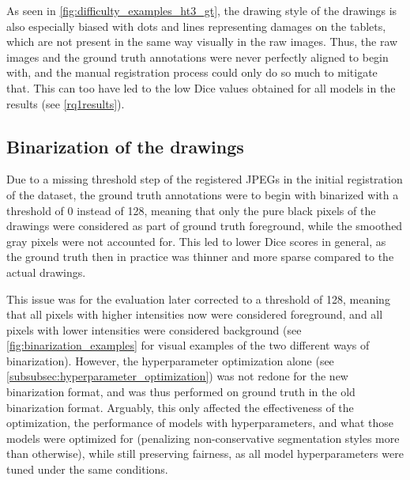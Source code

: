As seen in \cref{fig:difficulty_examples_ht3_gt}, the drawing style of the drawings is also especially biased with dots and lines representing damages on the tablets, which are not present in the same way visually in the raw images.
Thus, the raw images and the ground truth annotations were never perfectly aligned to begin with, and the manual registration process could only do so much to mitigate that.
This can too have led to the low \acs{Dice} values obtained for all models in the results (see \cref{rq1results}).

\subsection{Binarization of the drawings}
\label{subsec:binarization}
Due to a missing threshold step of the registered JPEGs in the initial registration of the dataset, the ground truth annotations were to begin with binarized with a threshold of 0 instead of 128, meaning that only the pure black pixels of the drawings were considered as part of ground truth foreground, while the smoothed gray pixels were not accounted for.
This led to lower \acs{Dice} scores in general, as the ground truth then in practice was thinner and more sparse compared to the actual drawings.

This issue was for the evaluation later corrected to a threshold of 128, meaning that all pixels with higher intensities now were considered foreground, and all pixels with lower intensities were considered background (see \cref{fig:binarization_examples} for visual examples of the two different ways of binarization).
However, the hyperparameter optimization alone (see \cref{subsubsec:hyperparameter_optimization}) was not redone for the new binarization format, and was thus performed on ground truth in the old binarization format.
Arguably, this only affected the effectiveness of the optimization, the performance of models with hyperparameters, and what those models were optimized for (penalizing non-conservative segmentation styles more than otherwise), while still preserving fairness, as all model hyperparameters were tuned under the same conditions.


